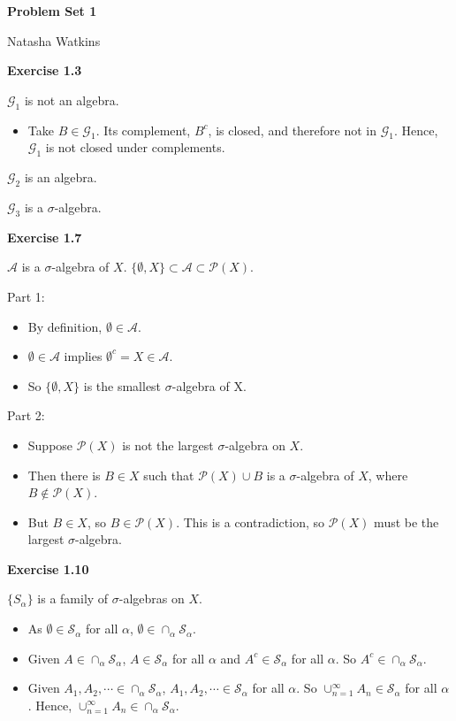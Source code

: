 \documentclass[letterpaper,12pt]{article}
\begin{document}
\textbf{\large Problem Set 1}

Natasha Watkins

\vspace{5mm}

\textbf{Exercise 1.3}

$\mathcal{G}_1$ is not an algebra.
\begin{itemize}
  \item Take $B \in \mathcal{G}_1$. Its complement, $B^c$, is closed, and therefore not in $\mathcal{G}_1$. Hence, $\mathcal{G}_1$ is not closed under complements.
\end{itemize}

$\mathcal{G}_2$ is an algebra.

$\mathcal{G}_3$ is a $\sigma$-algebra.


\textbf{Exercise 1.7}

$\mathcal{A}$ is a $\sigma$-algebra of $X$. $\{\emptyset, X\} \subset \mathcal{A} \subset \mathcal{P}(X)$.

Part 1:

\begin{itemize}
  \item By definition, $\emptyset \in \mathcal{A}$.
  \item $\emptyset \in \mathcal{A}$ implies $\emptyset^c = X \in \mathcal{A}$.
  \item So $\{\emptyset, X\}$ is the smallest $\sigma$-algebra of X.
\end{itemize}

Part 2:

\begin{itemize}
  \item Suppose $\mathcal{P} (X)$ is not the largest $\sigma$-algebra on $X$.
  \item Then there is $B \in X$ such that $\mathcal{P} (X) \cup B$ is a $\sigma$-algebra of $X$, where $B \not \in \mathcal{P} (X)$.
  \item But $B \in X$, so $B \in \mathcal{P} (X)$. This is a contradiction, so
  $\mathcal{P} (X)$ must be the largest $\sigma$-algebra.
\end{itemize}

\textbf{Exercise 1.10}

$\{S_\alpha\}$ is a family of $\sigma$-algebras on $X$.

\begin{itemize}
  \item As $\emptyset \in \mathcal{S}_\alpha$ for all $\alpha$,
  $\emptyset \in \cap_\alpha \mathcal{S}_\alpha$.
  \item Given $A \in \cap_\alpha \mathcal{S}_\alpha$, $A \in\mathcal{S}_\alpha$ for all $\alpha$ and $A^c \in \mathcal{S}_\alpha$ for all $\alpha$. So $A^c \in \cap_\alpha \mathcal{S}_\alpha$.
  \item Given $A_1, A_2, \cdots \in \cap_\alpha \mathcal{S}_\alpha$, $A_1, A_2, \cdots \in \mathcal{S}_\alpha$ for all $\alpha$. So $\cup_{n=1}^\infty A_n \in \mathcal{S}_\alpha$ for all $\alpha$. Hence, $\cup_{n=1}^\infty A_n \in \cap_\alpha \mathcal{S}_\alpha$.
\end{itemize}
\end{document}
